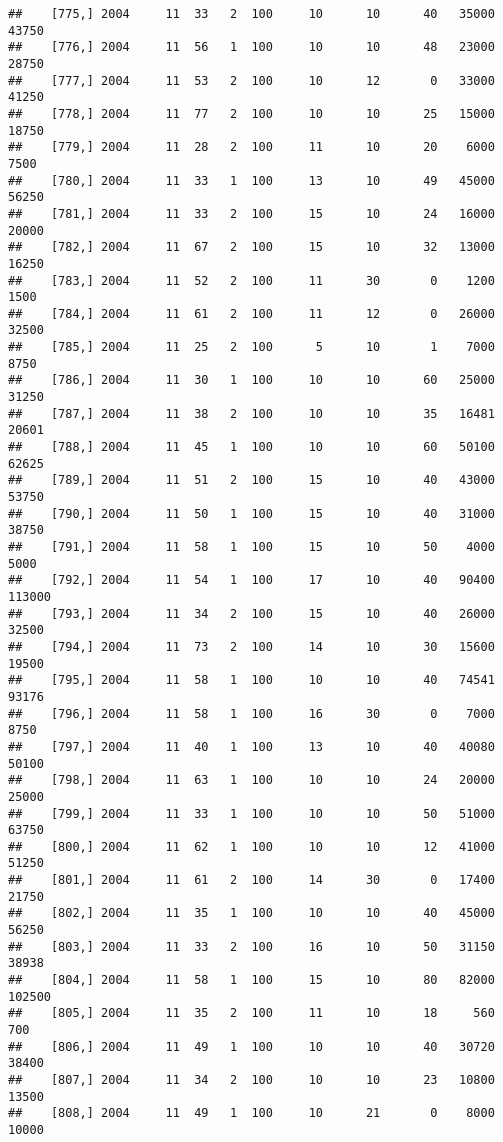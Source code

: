 \documentclass{article}\usepackage[]{graphicx}\usepackage[]{color}
\makeatletter
\newenvironment{kframe}{%
 \def\at@end@of@kframe{}%
 \ifinner\ifhmode%
  \def\at@end@of@kframe{\end{minipage}}%
  \begin{minipage}{\columnwidth}%
 \fi\fi%
 \def\FrameCommand##1{\hskip\@totalleftmargin \hskip-\fboxsep
 \colorbox{shadecolor}{##1}\hskip-\fboxsep
     \hskip-\linewidth \hskip-\@totalleftmargin \hskip\columnwidth}%
 \MakeFramed {\advance\hsize-\width
   \@totalleftmargin\z@ \linewidth\hsize
   \@setminipage}}%
 {\par\unskip\endMakeFramed%
 \at@end@of@kframe}
\newenvironment{knitrout}{}{} %
\makeatother
\begin{document}
\begin{knitrout}
\begin{kframe}
\begin{verbatim}
##    [775,] 2004     11  33   2  100     10      10      40   35000   43750
##    [776,] 2004     11  56   1  100     10      10      48   23000   28750
##    [777,] 2004     11  53   2  100     10      12       0   33000   41250
##    [778,] 2004     11  77   2  100     10      10      25   15000   18750
##    [779,] 2004     11  28   2  100     11      10      20    6000    7500
##    [780,] 2004     11  33   1  100     13      10      49   45000   56250
##    [781,] 2004     11  33   2  100     15      10      24   16000   20000
##    [782,] 2004     11  67   2  100     15      10      32   13000   16250
##    [783,] 2004     11  52   2  100     11      30       0    1200    1500
##    [784,] 2004     11  61   2  100     11      12       0   26000   32500
##    [785,] 2004     11  25   2  100      5      10       1    7000    8750
##    [786,] 2004     11  30   1  100     10      10      60   25000   31250
##    [787,] 2004     11  38   2  100     10      10      35   16481   20601
##    [788,] 2004     11  45   1  100     10      10      60   50100   62625
##    [789,] 2004     11  51   2  100     15      10      40   43000   53750
##    [790,] 2004     11  50   1  100     15      10      40   31000   38750
##    [791,] 2004     11  58   1  100     15      10      50    4000    5000
##    [792,] 2004     11  54   1  100     17      10      40   90400  113000
##    [793,] 2004     11  34   2  100     15      10      40   26000   32500
##    [794,] 2004     11  73   2  100     14      10      30   15600   19500
##    [795,] 2004     11  58   1  100     10      10      40   74541   93176
##    [796,] 2004     11  58   1  100     16      30       0    7000    8750
##    [797,] 2004     11  40   1  100     13      10      40   40080   50100
##    [798,] 2004     11  63   1  100     10      10      24   20000   25000
##    [799,] 2004     11  33   1  100     10      10      50   51000   63750
##    [800,] 2004     11  62   1  100     10      10      12   41000   51250
##    [801,] 2004     11  61   2  100     14      30       0   17400   21750
##    [802,] 2004     11  35   1  100     10      10      40   45000   56250
##    [803,] 2004     11  33   2  100     16      10      50   31150   38938
##    [804,] 2004     11  58   1  100     15      10      80   82000  102500
##    [805,] 2004     11  35   2  100     11      10      18     560     700
##    [806,] 2004     11  49   1  100     10      10      40   30720   38400
##    [807,] 2004     11  34   2  100     10      10      23   10800   13500
##    [808,] 2004     11  49   1  100     10      21       0    8000   10000

\end{verbatim}
\end{kframe}
\end{knitrout}
\end{document}
